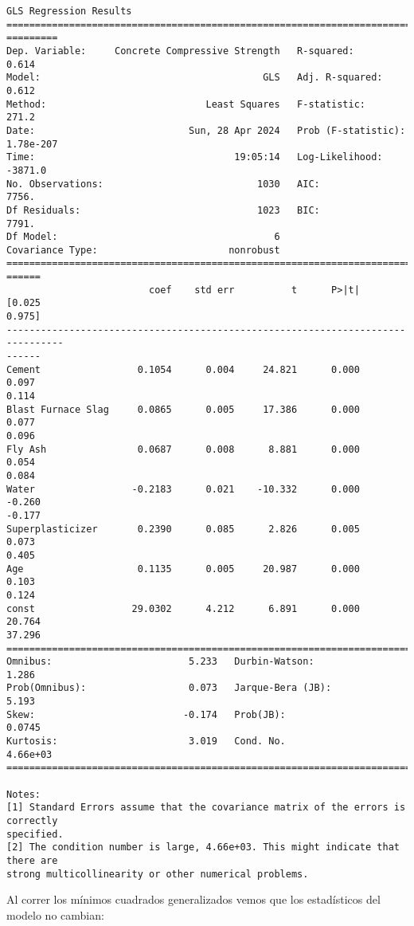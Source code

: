 \documentclass[11pt]{article}
\begin{document}
    \begin{Verbatim}[commandchars=\\\{\}]
                                  GLS Regression Results
================================================================================
=========
Dep. Variable:     Concrete Compressive Strength   R-squared:
0.614
Model:                                       GLS   Adj. R-squared:
0.612
Method:                            Least Squares   F-statistic:
271.2
Date:                           Sun, 28 Apr 2024   Prob (F-statistic):
1.78e-207
Time:                                   19:05:14   Log-Likelihood:
-3871.0
No. Observations:                           1030   AIC:
7756.
Df Residuals:                               1023   BIC:
7791.
Df Model:                                      6
Covariance Type:                       nonrobust
================================================================================
======
                         coef    std err          t      P>|t|      [0.025
0.975]
--------------------------------------------------------------------------------
------
Cement                 0.1054      0.004     24.821      0.000       0.097
0.114
Blast Furnace Slag     0.0865      0.005     17.386      0.000       0.077
0.096
Fly Ash                0.0687      0.008      8.881      0.000       0.054
0.084
Water                 -0.2183      0.021    -10.332      0.000      -0.260
-0.177
Superplasticizer       0.2390      0.085      2.826      0.005       0.073
0.405
Age                    0.1135      0.005     20.987      0.000       0.103
0.124
const                 29.0302      4.212      6.891      0.000      20.764
37.296
==============================================================================
Omnibus:                        5.233   Durbin-Watson:                   1.286
Prob(Omnibus):                  0.073   Jarque-Bera (JB):                5.193
Skew:                          -0.174   Prob(JB):                       0.0745
Kurtosis:                       3.019   Cond. No.                     4.66e+03
==============================================================================

Notes:
[1] Standard Errors assume that the covariance matrix of the errors is correctly
specified.
[2] The condition number is large, 4.66e+03. This might indicate that there are
strong multicollinearity or other numerical problems.
    \end{Verbatim}

    Al correr los mínimos cuadrados generalizados vemos que los estadísticos
del modelo no cambian:
\end{document}
